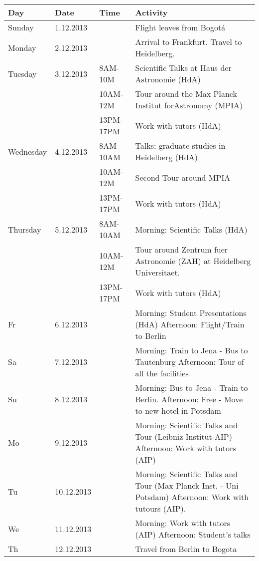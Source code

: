 \documentclass[12pt]{article}
\begin{document}
\begin{tabular}{p{2cm}p{2cm}p{2.5cm}p{7.0cm}}
Day & Date & Time & Activity\\\hline\hline
Sunday & 1.12.2013 & &	Flight leaves from Bogot\'a \\\hline
Monday & 2.12.2013 & &	Arrival to Frankfurt. Travel to Heidelberg.\\\hline
Tuesday &3.12.2013  & 8AM-10M & Scientific Talks at Haus der
Astronomie (HdA)\\
&  & 10AM-12M  & Tour around the Max Planck Institut forAstronomy (MPIA)\\
 & & 13PM-17PM & Work with tutors (HdA)\\\hline
Wednesday &4.12.2013  & 8AM-10AM & Talks: graduate studies in Heidelberg (HdA)\\
 & & 10AM-12M  &Second Tour around MPIA\\
 & & 13PM-17PM & Work with tutors (HdA)\\\hline
Thursday &5.12.2013&8AM-10AM	&Morning: Scientific Talks (HdA)\\
& & 10AM-12M & Tour around Zentrum fuer Astronomie (ZAH) at Heidelberg Universitaet.\\
& & 13PM-17PM  & Work with tutors (HdA)\\\hline

Fr &6.12.2013&&	Morning: Student Presentations (HdA)   		Afternoon: Flight/Train to Berlin\\

Sa &7.12.2013&&	Morning: Train to Jena - Bus to Tautenburg   		Afternoon: Tour of all the facilities\\
Su &8.12.2013&	&Morning: Bus to Jena - Train to Berlin.   		Afternoon: Free - Move to new hotel in Potsdam\\
Mo &9.12.2013&	&Morning: Scientific Talks and Tour (Leibniz
Institut-AIP)	Afternoon: Work with tutors (AIP)\\ 

Tu &10.12.2013&	&Morning: Scientific Talks and Tour (Max Planck Inst. -
Uni Potsdam)   		Afternoon: Work with tutours (AIP).\\ 

We &11.12.2013 &  &Morning: Work with tutors (AIP)
Afternoon: Student's talks\\ 

Th &12.12.2013&	& Travel from Berlin to Bogota\\
\end{tabular}
\end{document}
